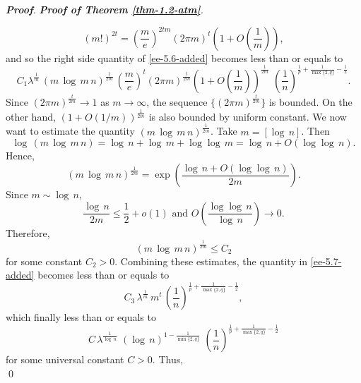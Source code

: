 \documentclass[a4paper,11pt, reqno]{amsart}
\theoremstyle{definition}
\newenvironment{pf}[1][]{%
	\vskip 3mm
	\noindent
	\ifthenelse{\equal{#1}{}}%
	{{\slshape {\bf Proof}. }}%
	{{\slshape #1.} }%
}%
{\qed\bigskip}
\begin{document}
\begin{pf}[{\bf Proof of Theorem \ref{thm-1.2-atm}}]
\begin{equation*}
(m!)^{2t} = \left(\frac{m}{e}\right)^{2tm} (2 \pi m)^{t} \left(1+O\left(\frac{1}{m}\right)\right),
\end{equation*}
and so the right side quantity of \eqref{ee-5.6-added} becomes less than or equals to
\begin{equation} \label{ee-5.7-added}
C_1 \lambda^{\frac{1}{m}}\, (m\, \log\,m \, n)^{\frac{1}{2m}}\, \left(\frac{m}{e}\right)^{t} (2 \pi m)^{\frac{t}{2m}} \left(1+O\left(\frac{1}{m}\right)\right)^{\frac{1}{2m}}\, \, \left(\frac{1}{n}\right)^{\frac{1}{p}+\frac{1}{\max\{2,q\}}-\frac{1}{2}}.
\end{equation}
Since $(2 \pi m)^{\frac{t}{2m}} \rightarrow 1$ as $m \rightarrow \infty$, the sequence $\{(2 \pi m)^{\frac{t}{2m}}\}$ is bounded. On the other hand, $(1+O(1/m))^{\frac{1}{2m}}$ is also bounded by uniform constant. We now want to estimate the quantity $(m\, \log\,m \, n)^{\frac{1}{2m}}$. Take $m=[\log\,n]$. Then
\begin{equation*}
\log\, (m\, \log\,m \, n)=\log\, n + \log\, m +\log\log\,m= \log \,n + O(\log\log \,n).
\end{equation*}
Hence,
\begin{equation*}
(m\, \log\,m \, n)^{\frac{1}{2m}}= \exp \left(\frac{\log \,n + O(\log\log \,n)}{2m}\right).
\end{equation*}
Since $m \sim \log \, n$,
\begin{equation*}
\frac{\log \,n}{2m} \leq \frac{1}{2} + o(1)\,\, \mbox{and} \, \, O\left(\frac{\log\log \,n}{\log \, n}\right) \rightarrow 0.
\end{equation*}
Therefore,
\begin{equation*}
(m\, \log\,m \, n)^{\frac{1}{2m}} \leq C_2	
\end{equation*}
for some constant $C_2>0$. Combining these estimates, the quantity in \eqref{ee-5.7-added} becomes less than or equals to
\begin{equation*}
C_{3}\, \lambda^{\frac{1}{m}}\, m^t\,	\left(\frac{1}{n}\right)^{\frac{1}{p}+\frac{1}{\max\{2,q\}}-\frac{1}{2}}, 
\end{equation*}
which finally less than or equals to
\begin{equation*}
C\, \lambda^{\frac{1}{\log\,n}}\,\, (\log\,n)^{1-\frac{1}{\min\{2,q\}}}\,\,\left(\frac{1}{n}\right)^{\frac{1}{p}+\frac{1}{\max\{2,q\}}-\frac{1}{2}}
\end{equation*}
for some universal constant $C>0$.
Thus,
\begin{equation} \label{ee-5.8-added}

\end{equation}
\end{pf}
\end{document}

